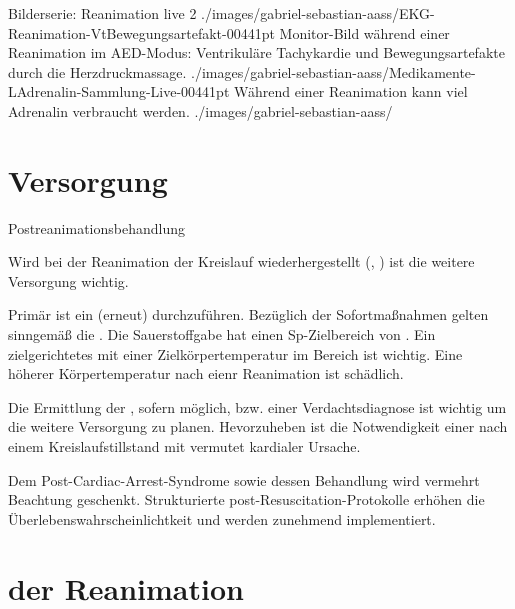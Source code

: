 \begin{PictureSeriesWide}{}{Bilderserie: Reanimation live}
\PictureSeriesRowWide
{2}%
{./images/gabriel-sebastian-aass/EKG-Reanimation-VtBewegungsartefakt-00441pt}%
{Monitor-Bild während einer Reanimation im AED-Modus: Ventrikuläre Tachykardie und Bewegungsartefakte durch die Herzdruckmassage.}%
{./images/gabriel-sebastian-aass/Medikamente-LAdrenalin-Sammlung-Live-00441pt}%
{Während einer Reanimation kann viel Adrenalin verbraucht werden.}%
{./images/gabriel-sebastian-aass/}%
{}%
{}%
{}%
\end{PictureSeriesWide}


\section{Versorgung }

\Text
{Postreanimationsbehandlung}%
{%
Wird bei der Reanimation der Kreislauf wiederhergestellt
(, ) ist
die weitere Versorgung wichtig. 

Primär ist ein  (erneut) durchzuführen. 
%
Bezüglich der Sofortmaßnahmen gelten sinngemäß die \EE{\TxMassVit}. 
%
Die Sauerstoffgabe hat einen Sp-Zielbereich von \PC*.
%
Ein zielgerichtetes  mit einer Zielkörpertemperatur im Bereich  ist wichtig.
%
Eine höherer Körpertemperatur nach eienr Reanimation ist schädlich.

Die Ermittlung der , 
sofern möglich, 
bzw. einer Verdachtsdiagnose 
ist wichtig um die weitere Versorgung zu planen.
%
Hevorzuheben ist die Notwendigkeit einer  
nach einem Kreislaufstillstand 
mit vermutet kardialer Ursache.

Dem Post-Cardiac-Arrest-Syndrome sowie dessen Behandlung
wird vermehrt Beachtung geschenkt.
Strukturierte post-Resuscitation-Protokolle erhöhen die
Überlebenswahrscheinlichtkeit und werden zunehmend
implementiert. 
%
\cite{Erc-2015-Sektion-05-De,Erc-2015-Section-05}

}%




\section{ der Reanimation}

